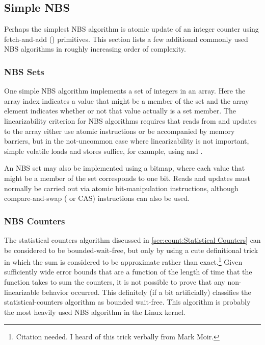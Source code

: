 \subsection{Simple NBS}
\label{sec:advsync:Simple NBS}

Perhaps the simplest NBS algorithm is atomic update of an integer
counter using fetch-and-add () primitives.
This section lists a few additional commonly used NBS algorithms in
roughly increasing order of complexity.

\subsubsection{NBS Sets}
\label{sec:advsync:NBS Sets}

One simple NBS algorithm implements a set of integers in an array.
Here the array index indicates a value that might be a member of the set
and the array element indicates whether or not that value actually is
a set member.
The linearizability criterion for NBS algorithms requires that reads from
and updates to the array either use atomic instructions or be accompanied
by memory barriers, but in the not-uncommon case where linearizability
is not important, simple volatile loads and stores suffice, for example,
using  and .

An NBS set may also be implemented using a bitmap, where each value that
might be a member of the set corresponds to one bit.
Reads and updates must normally be carried out via atomic bit-manipulation
instructions, although compare-and-swap ( or CAS)
instructions can also be used.

\subsubsection{NBS Counters}
\label{sec:advsync:NBS Counters}

The statistical counters algorithm discussed in
\cref{sec:count:Statistical Counters}
can be considered to be bounded-wait-free, but only by using a cute
definitional trick in which the sum is considered to be approximate
rather than exact.\footnote{
	Citation needed.
	I heard of this trick verbally from Mark Moir.}
Given sufficiently wide error bounds that are a function of the length
of time that the  function takes to sum the counters,
it is not possible to prove that any non-linearizable behavior occurred.
This definitely (if a bit artificially) classifies the statistical-counters
algorithm as bounded wait-free.
This algorithm is probably the most heavily used NBS algorithm in the
Linux kernel.

